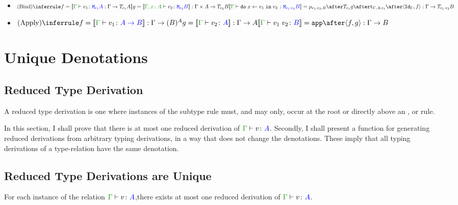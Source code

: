 \documentclass{report}
\begin{document}
\begin{itemize}
    \item $\ntreeruleII{\vbind}{f = \deno{\typerelation{\G}{v_1}{\M{\e_1}{A}} : \G \rightarrow \T{\e_1}{A}}}{{ g = \deno{\typerelation{\gax}{v_2}{\M{\e_2}{B}}}}: \G \times A \rightarrow \T{\e_2}{B}}{\deno{\typerelation{\G}{\doin{x}{v_1}{v_2}}{\M{\e_1 \dot \e_2}{B}}} = \bind{\e_1}{\e_2}{B} \after \T{\e_1}{g} \after \tstrength{\G}{A}{\e_1} \after \pr{\idg}{f}: \G \rightarrow \T{\e_1 \dot \e_2}{B}}$ 
    
    \item $\ntreeruleII{\vapply}{f = \deno{\gtyperelation{v_1}{\ab}}: \G \rightarrow (B)^{A} }{ g=\deno{\gtyperelation{v_2}{A}}: \G \rightarrow A}{\deno{\gtyperelation{\apply{v_1}{v_2}}{B}}= \app\after\pr{f}{g}: \G \rightarrow B }$
\end{itemize}  

\chapter{Unique Denotations}
 
\section{Reduced Type Derivation}
A reduced type derivation is one where instances of the subtype rule must, and may only, occur at the root or directly above an \textit{\vif}, or \textit{\vapply} rule.

In this section, I shall prove that there is at most one reduced derivation of $\gtyperelation{v}{A}$. Secondly, I shall present a function for generating reduced derivations from arbitrary typing derivations, in a way that does not change the denotations. These imply that all typing derivations of a type-relation have the same denotation.

\section{Reduced Type Derivations are Unique}

\begin{theorem}
    For each instance of the relation $\gtyperelation{v}{A}$,there exists at most one reduced derivation of  $\gtyperelation{v}{A}$.  
\end{theorem}
\end{document}
